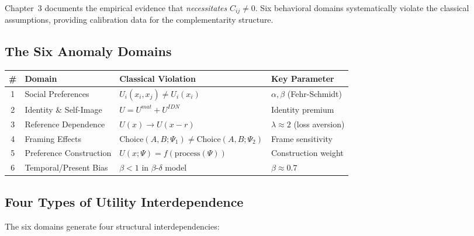 Chapter~3 documents the empirical evidence that \textit{necessitates} $C_{ij} \neq 0$.
Six behavioral domains systematically violate the classical assumptions,
providing calibration data for the complementarity structure.

\subsection{The Six Anomaly Domains}

\begin{center}
\renewcommand{\arraystretch}{1.3}
\begin{tabular}{@{}clll@{}}
\toprule
\textbf{\#} & \textbf{Domain} & \textbf{Classical Violation} & \textbf{Key Parameter} \\
\midrule
1 & Social Preferences & $U_i(x_i, x_j) \neq U_i(x_i)$ & $\alpha, \beta$ (Fehr-Schmidt) \\
2 & Identity \& Self-Image & $U = U^{mat} + U^{IDN}$ & Identity premium \\
3 & Reference Dependence & $U(x) \to U(x - r)$ & $\lambda \approx 2$ (loss aversion) \\
4 & Framing Effects & $\text{Choice}(A,B;\Psi_1) \neq \text{Choice}(A,B;\Psi_2)$ & Frame sensitivity \\
5 & Preference Construction & $U(x;\Psi) = f(\text{process}(\Psi))$ & Construction weight \\
6 & Temporal/Present Bias & $\beta < 1$ in $\beta$-$\delta$ model & $\beta \approx 0.7$ \\
\bottomrule
\end{tabular}
\end{center}

\subsection{Four Types of Utility Interdependence}

The six domains generate four structural interdependencies:

